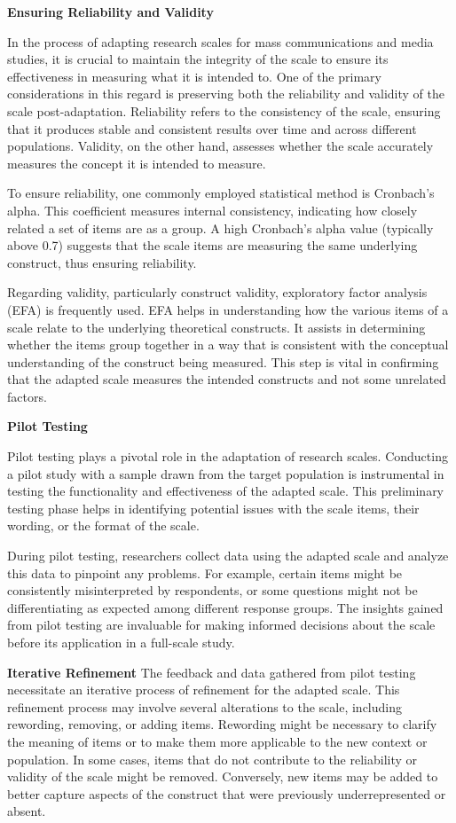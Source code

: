 \documentclass[
]{book}
\begin{document}
\textbf{Ensuring Reliability and Validity}

In the process of adapting research scales for mass communications and media studies, it is crucial to maintain the integrity of the scale to ensure its effectiveness in measuring what it is intended to. One of the primary considerations in this regard is preserving both the reliability and validity of the scale post-adaptation. Reliability refers to the consistency of the scale, ensuring that it produces stable and consistent results over time and across different populations. Validity, on the other hand, assesses whether the scale accurately measures the concept it is intended to measure.

To ensure reliability, one commonly employed statistical method is Cronbach's alpha. This coefficient measures internal consistency, indicating how closely related a set of items are as a group. A high Cronbach's alpha value (typically above 0.7) suggests that the scale items are measuring the same underlying construct, thus ensuring reliability.

Regarding validity, particularly construct validity, exploratory factor analysis (EFA) is frequently used. EFA helps in understanding how the various items of a scale relate to the underlying theoretical constructs. It assists in determining whether the items group together in a way that is consistent with the conceptual understanding of the construct being measured. This step is vital in confirming that the adapted scale measures the intended constructs and not some unrelated factors.

\textbf{Pilot Testing}

Pilot testing plays a pivotal role in the adaptation of research scales. Conducting a pilot study with a sample drawn from the target population is instrumental in testing the functionality and effectiveness of the adapted scale. This preliminary testing phase helps in identifying potential issues with the scale items, their wording, or the format of the scale.

During pilot testing, researchers collect data using the adapted scale and analyze this data to pinpoint any problems. For example, certain items might be consistently misinterpreted by respondents, or some questions might not be differentiating as expected among different response groups. The insights gained from pilot testing are invaluable for making informed decisions about the scale before its application in a full-scale study.

\textbf{Iterative Refinement} The feedback and data gathered from pilot testing necessitate an iterative process of refinement for the adapted scale. This refinement process may involve several alterations to the scale, including rewording, removing, or adding items. Rewording might be necessary to clarify the meaning of items or to make them more applicable to the new context or population. In some cases, items that do not contribute to the reliability or validity of the scale might be removed. Conversely, new items may be added to better capture aspects of the construct that were previously underrepresented or absent.
\end{document}
